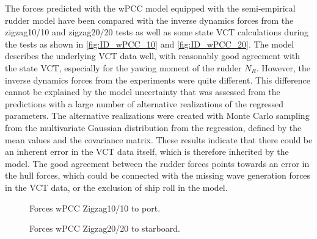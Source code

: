 \noindent The forces predicted with the wPCC model equipped with the semi-empirical rudder model have been compared with the inverse dynamics forces from the zigzag10/10 and zigzag20/20 tests as well as some state VCT calculations during the tests as shown in \autoref{fig:ID_wPCC_10} and \autoref{fig:ID_wPCC_20}. 
The model describes the underlying VCT data well, with reasonably good agreement with the state VCT, especially for the yawing moment of the rudder $N_R$. However, the inverse dynamics forces from the experiments were quite different. 
This difference cannot be explained by the model uncertainty that was assessed from the predictions with a large number of alternative realizations of the regressed parameters. The alternative realizations were created with Monte Carlo sampling from the multivariate Gaussian distribution from the regression, defined by the mean values and the covariance matrix.   
These results indicate that there could be an inherent error in the VCT data itself, which is therefore inherited by the model. The good agreement between the rudder forces points towards an error in the hull forces, which could be connected with the missing wave generation forces in the VCT data, or the exclusion of ship roll in the model.
\begin{figure}[h!]
     \centering
     
     \caption{Forces wPCC Zigzag10/10 to port.}
     \label{fig:ID_wPCC_10}
\end{figure}

\vspace{-0.4cm}
\begin{figure}[h]
    \centering
    
    \caption{Forces wPCC Zigzag20/20 to starboard.}
    \label{fig:ID_wPCC_20}
\end{figure}
%         
%         
